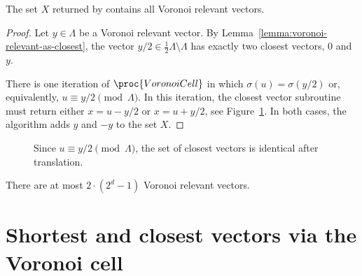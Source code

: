 \begin{lemma}
  \label{lemma:voronoi-cell-computation}
  The set $X$ returned by  contains all Voronoi relevant vectors.
\end{lemma}
\begin{proof}
  Let $y \in \Lambda$ be a Voronoi relevant vector.
  By Lemma~\ref{lemma:voronoi-relevant-as-closest},
  the vector $y/2 \in \frac{1}{2}\Lambda \setminus \Lambda$ has exactly two closest vectors,
  $0$ and $y$.

  There is one iteration of $\proc{VoronoiCell}$ in which $\sigma(u) = \sigma(y/2)$
  or, equivalently, $u \equiv y/2 \pmod{\Lambda}$.
  In this iteration, the closest vector subroutine must return
  either $x = u - y/2$ or $x = u + y/2$, see Figure~\ref{fig:voronoi-cell-computation}.
  In both cases, the algorithm adds $y$ and $-y$ to the set $X$.
\end{proof}
\begin{figure}
  \begin{center}
  \end{center}
  \caption{Since $u \equiv y/2 \pmod\Lambda$, the set of closest vectors is identical after translation.}
  \label{fig:voronoi-cell-computation}
\end{figure}


\begin{corollary}
  \label{cor:number-of-voronoi-relevant}
  There are at most $2 \cdot (2^d - 1)$ Voronoi relevant vectors.
\end{corollary}



\section{Shortest and closest vectors via the Voronoi cell}

